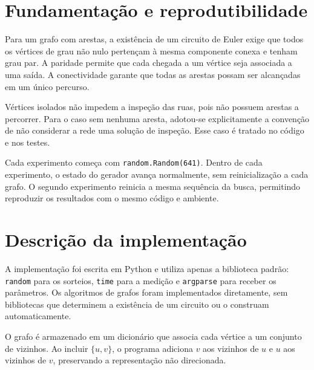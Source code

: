 \documentclass[11pt,a4paper]{article}
\newcommand{\funcao}[1]{\texttt{#1}}
\begin{document}
\section{Fundamentação e reprodutibilidade}

Para um grafo com arestas, a existência de um circuito de Euler exige que
todos os vértices de grau não nulo pertençam à mesma componente conexa e
tenham grau par. A paridade permite que cada chegada a um vértice seja
associada a uma saída. A conectividade garante que todas as arestas possam
ser alcançadas em um único percurso.

Vértices isolados não impedem a inspeção das ruas, pois não possuem arestas
a percorrer. Para o caso sem nenhuma aresta, adotou-se explicitamente a
convenção de não considerar a rede uma solução de inspeção. Esse caso é
tratado no código e nos testes.

Cada experimento começa com \funcao{random.Random(641)}. Dentro de cada
experimento, o estado do gerador avança normalmente, sem reinicialização
a cada grafo. O segundo experimento reinicia a mesma sequência da busca,
permitindo reproduzir os resultados com o mesmo código e ambiente.

\newpage
\section{Descrição da implementação}

A implementação foi escrita em Python e utiliza apenas a biblioteca padrão:
\funcao{random} para os sorteios, \funcao{time} para a medição e
\funcao{argparse} para receber os parâmetros. Os algoritmos de grafos foram
implementados diretamente, sem bibliotecas que determinem a existência
de um circuito ou o construam automaticamente.

O grafo é armazenado em um dicionário que associa cada vértice a um conjunto
de vizinhos. Ao incluir $\{u,v\}$, o programa adiciona $v$ aos vizinhos de $u$
e $u$ aos vizinhos de $v$, preservando a representação não direcionada.
\end{document}
